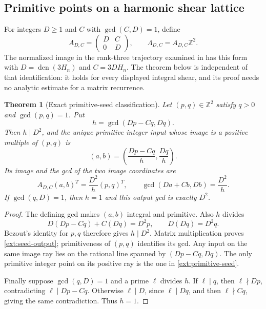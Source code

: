\documentclass[11pt,a4paper]{article}
\numberwithin{equation}{section}
\newtheorem{theorem}{Theorem}[section]
\theoremstyle{definition}
\theoremstyle{remark}
\begin{document}
\subsection{Primitive points on a harmonic shear lattice}

For integers $D\ge1$ and $C$ with $\gcd(C,D)=1$, define
\[
 A_{D,C}=\begin{pmatrix}D&C\\0&D\end{pmatrix},\qquad
 \Lambda_{D,C}=A_{D,C}\mathbb Z^2.
\]
The normalized image in the rank-three trajectory examined in
\cite[Section 8]{Integrated2026} has this form with
$D=\operatorname{den}(3H_n)$ and $C=3DH_n$. The theorem below is
independent of that identification: it holds for every displayed
integral shear, and its proof needs no analytic estimate for a matrix
recurrence.

\begin{theorem}[Exact primitive-seed classification]
\label{ext:seed-classification}
Let $(p,q)\in\mathbb Z^2$ satisfy $q>0$ and $\gcd(p,q)=1$. Put
\[
 h=\gcd(Dp-Cq,Dq).
\]
Then $h\mid D^2$, and the unique primitive integer input whose image
is a positive multiple of $(p,q)$ is
\begin{equation}\label{ext:primitive-seed}
 (a,b)=\left(\frac{Dp-Cq}{h},\frac{Dq}{h}\right).
\end{equation}
Its image and the gcd of the two image coordinates are
\begin{equation}\label{ext:seed-output}
 A_{D,C}(a,b)^T=\frac{D^2}{h}(p,q)^T,
 \qquad \gcd(Da+Cb,Db)=\frac{D^2}{h}.
\end{equation}
If $\gcd(q,D)=1$, then $h=1$ and this output gcd is exactly $D^2$.
\end{theorem}
\begin{proof}
The defining gcd makes $(a,b)$ integral and primitive. Also $h$
divides
\[
 D(Dp-Cq)+C(Dq)=D^2p,
 \qquad D(Dq)=D^2q.
\]
Bezout's identity for $p,q$ therefore gives $h\mid D^2$.
Matrix multiplication proves \eqref{ext:seed-output}; primitiveness
of $(p,q)$ identifies its gcd. Any input on the same image ray lies
on the rational line spanned by $(Dp-Cq,Dq)$. The only primitive
integer point on its positive ray is the one in
\eqref{ext:primitive-seed}.

Finally suppose $\gcd(q,D)=1$ and a prime $\ell$ divides $h$.
If $\ell\mid q$, then $\ell\nmid Dp$, contradicting
$\ell\mid Dp-Cq$. Otherwise $\ell\mid D$, since $\ell\mid Dq$,
and then $\ell\nmid Cq$, giving the same contradiction.
Thus $h=1$.
\end{proof}
\end{document}
